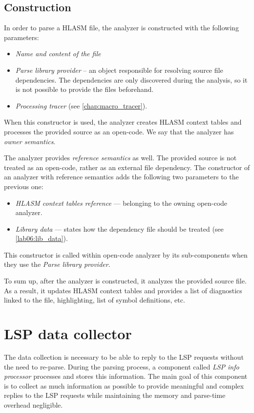 \subsection{Construction}

In order to parse a HLASM file, the analyzer is constructed with the following parameters:
\begin{itemize}
	\item \emph{Name and content of the file}
	\item \emph{Parse library provider} -- an object responsible for resolving source file dependencies. The dependencies are only discovered during the analysis, so it is not possible to provide the files beforehand.
	\item \emph{Processing tracer} (see \cref{chap:macro_tracer}).
\end{itemize}

When this constructor is used, the analyzer creates HLASM context tables and processes the provided source as an open-code. We say that the analyzer has \emph{owner semantics}. 
 
The analyzer provides \emph{reference semantics} as well. The provided source is not treated as an open-code, rather as an external file dependency. The constructor of an analyzer with reference semantics adds the following two parameters to the previous one:
\begin{itemize}
	\item \emph{HLASM context tables reference} --- belonging to the owning open-code analyzer.
	\item \emph{Library data} --- states how the dependency file should be treated (see \cref{lab06:lib_data}).
\end{itemize}

This constructor is called within open-code analyzer by its sub-components when they use the \emph{Parse library provider}.

\vspace{0.5cm}

To sum up, after the analyzer is constructed, it analyzes the provided source file. As a result, it updates HLASM context tables and provides a list of diagnostics linked to the file, highlighting, list of symbol definitions, etc.

\section{LSP data collector}

The data collection is necessary to be able to reply to the LSP requests without the need to re-parse. During the parsing process, a component called \emph{LSP info processor} processes and stores this information. The main goal of this component is to collect as much information as possible to provide meaningful and complex replies to the LSP requests while maintaining the memory and parse-time overhead negligible.

